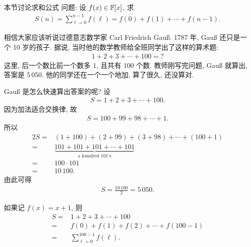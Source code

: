 \subsection*{\SummationFormulae}
\markright{\SummationFormulae}

本节讨论求和公式  问题: 设 $f(x) \in \mathbb{F}[x]$, 求
\begin{align*}
    S(n) = \sum_{\ell = 0}^{n - 1} f(\ell) = f(0) + f(1) + \cdots + f(n - 1).
\end{align*}

\begin{example}
    相信大家应该听说过德意志数学家 Carl Friedrich Gauß. 1787 年, Gauß 还只是一个 10 岁的孩子. 据说, 当时他的数学教师给全班同学出了这样的算术题:
    \begin{align*}
        1 + 2 + 3 + \cdots + 100 = ?
    \end{align*}
    这里, 后一个数比前一个数多 $1$, 且共有 $100$ 个数. 教师刚写完问题, Gauß 就算出, 答案是 $5\,050$. 他的同学还在一个一个地加, 算了很久, 还没算对.

    Gauß 是怎么快速算出答案的呢? 设
    \begin{align*}
        S = 1 + 2 + 3 + \cdots + 100.
    \end{align*}
    因为加法适合交换律, 故
    \begin{align*}
        S = 100 + 99 + 98 + \cdots + 1.
    \end{align*}
    所以
    \begin{align*}
        2S
        = {} & (1 + 100) + (2 + 99) + (3 + 98) + \cdots + (100 + 1) \\
        = {} & \underbrace{101 + 101 + 101 + \cdots + 101}
        _{\text{a hundred $101$'s}}                                 \\
        = {} & 100 \cdot 101                                        \\
        = {} & 10\,100.
    \end{align*}
    由此可得
    \begin{align*}
        S = \frac{10\,100}{2} = 5\,050.
    \end{align*}

    如果记 $f(x) = x + 1$, 则
    \begin{align*}
        S
        = {} & 1 + 2 + 3 + \cdots + 100                 \\
        = {} & f(0) + f(1) + f(2) + \cdots + f(100 - 1) \\
        = {} & \sum_{\ell = 0}^{100 - 1} f(\ell).
    \end{align*}


\end{example}
